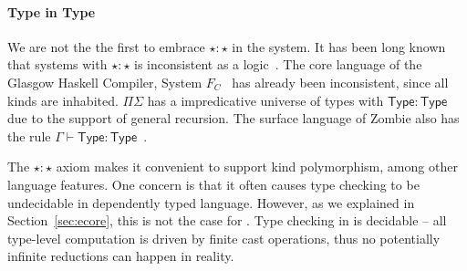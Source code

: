 

\paragraph{Type in Type}
We are not the the first to embrace $\star : \star$ in the system. It
has been long known that systems with $\star : \star$ is inconsistent
as a logic~\cite{handbook}. The core language of the Glasgow Haskell
Compiler, System $F_{C}$~\cite{fc} has already been inconsistent,
since all kinds are inhabited. $\Pi\Sigma$ has a impredicative
universe of types with $\mathsf{Type} : \mathsf{Type}$ due to the
support of general recursion. The surface language of Zombie also has
the rule
$\Gamma \vdash \mathsf{Type} : \mathsf{Type}$~\cite{zombie:popl15}.

The $\star : \star$ axiom makes it convenient to support kind
polymorphism, among other language features. One concern is that it
often causes type checking to be undecidable in dependently typed
language.  However, as we explained in Section~\ref{sec:ecore}, this
is not the case for \name. Type checking in \name is decidable -- all
type-level computation is driven by finite cast operations, thus no
potentially infinite reductions can happen in reality.

